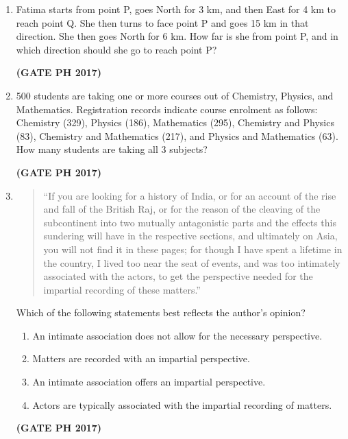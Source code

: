 \documentclass[14pt, a4paper]{extarticle}
\begin{document}
\begin{enumerate}[label=\textbf{Q.\arabic*}]
\item Fatima starts from point P, goes North for 3 km, and then East for 4 km to reach point Q. She then turns to face point P and goes 15 km in that direction. She then goes North for 6 km. How far is she from point P, and in which direction should she go to reach point P?
\begin{enumerate}
\end{enumerate}
\hfill \textbf{(GATE PH 2017)}

\item 500 students are taking one or more courses out of Chemistry, Physics, and Mathematics. Registration records indicate course enrolment as follows: Chemistry (329), Physics (186), Mathematics (295), Chemistry and Physics (83), Chemistry and Mathematics (217), and Physics and Mathematics (63). How many students are taking all 3 subjects?
\begin{enumerate}
\end{enumerate}
\hfill \textbf{(GATE PH 2017)}

\item 
\begin{quote}
“If you are looking for a history of India, or for an account of the rise and fall of the British Raj, or for the reason of the cleaving of the subcontinent into two mutually antagonistic parts and the effects this sundering will have in the respective sections, and ultimately on Asia, you will not find it in these pages; for though I have spent a lifetime in the country, I lived too near the seat of events, and was too intimately associated with the actors, to get the perspective needed for the impartial recording of these matters.”
\end{quote}
Which of the following statements best reflects the author’s opinion?
\begin{enumerate}
\item An intimate association does not allow for the necessary perspective.
\item Matters are recorded with an impartial perspective.
\item An intimate association offers an impartial perspective.
\item Actors are typically associated with the impartial recording of matters.
\end{enumerate}
\hfill \textbf{(GATE PH 2017)}


\end{enumerate}
\end{document}
